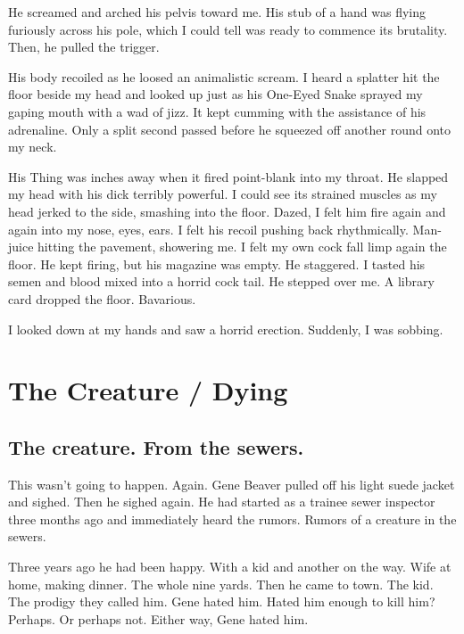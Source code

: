 He screamed and arched his pelvis toward me. His stub of a hand was
flying furiously across his pole, which I could tell was ready to
commence its brutality. Then, he pulled the trigger.



His body recoiled as he loosed an animalistic scream. I heard a
splatter hit the floor beside my head and looked up just as his
One-Eyed Snake sprayed my gaping mouth with a wad of jizz. It kept
cumming with the assistance of his adrenaline. Only a split second
passed before he squeezed off another round onto my neck.



His Thing was inches away when it fired point-blank into my throat.
He slapped my head with his dick terribly powerful. I could see its
strained muscles as my head jerked to the side, smashing into the
floor. Dazed, I felt him fire again and again into my nose, eyes,
ears. I felt his recoil pushing back rhythmically. Man-juice
hitting the pavement, showering me. I felt my own cock fall limp
again the floor. He kept firing, but his magazine was empty. He
staggered. I tasted his semen and blood mixed into a horrid cock
tail. He stepped over me. A library card dropped the floor.
Bavarious.



I looked down at my hands and saw a horrid erection. Suddenly, I
was sobbing. 
 



\chapter{The Creature / Dying}


\section*{The creature. From the sewers.}

This wasn't going to happen. Again. Gene Beaver pulled off his light
suede jacket and sighed. Then he sighed again. He had started as a
trainee sewer inspector three months ago and immediately heard the
rumors. Rumors of a creature in the sewers.

Three years ago he had been happy. With a kid and another on the
way. Wife at home, making dinner. The whole nine yards. Then he came to
town. The kid. The prodigy they called him. Gene hated him. Hated him
enough to kill him? Perhaps. Or perhaps not. Either way, Gene hated him.

